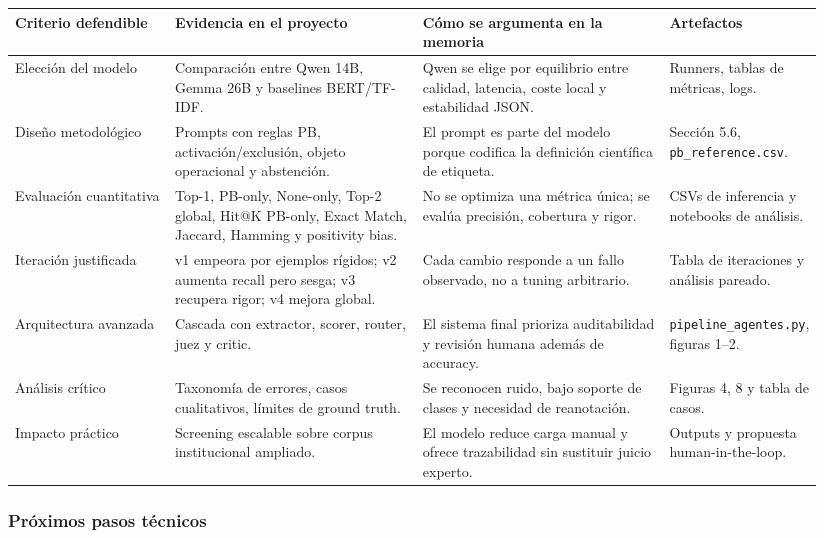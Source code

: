 \begin{center}
\scriptsize
\setlength{\tabcolsep}{4pt}
\renewcommand{\arraystretch}{1.18}
\begin{tabular}{p{0.20\linewidth}p{0.31\linewidth}p{0.31\linewidth}p{0.12\linewidth}}
\toprule
Criterio defendible & Evidencia en el proyecto & Cómo se argumenta en la memoria & Artefactos \\
\midrule
Elección del modelo & Comparación entre Qwen 14B, Gemma 26B y baselines BERT/TF-IDF. & Qwen se elige por equilibrio entre calidad, latencia, coste local y estabilidad JSON. & Runners, tablas de métricas, logs. \\
Diseño metodológico & Prompts con reglas PB, activación/exclusión, objeto operacional y abstención. & El prompt es parte del modelo porque codifica la definición científica de etiqueta. & Sección 5.6, \texttt{pb\_reference.csv}. \\
Evaluación cuantitativa & Top-1, PB-only, None-only, Top-2 global, Hit@K PB-only, Exact Match, Jaccard, Hamming y positivity bias. & No se optimiza una métrica única; se evalúa precisión, cobertura y rigor. & CSVs de inferencia y notebooks de análisis. \\
Iteración justificada & v1 empeora por ejemplos rígidos; v2 aumenta recall pero sesga; v3 recupera rigor; v4 mejora global. & Cada cambio responde a un fallo observado, no a tuning arbitrario. & Tabla de iteraciones y análisis pareado. \\
Arquitectura avanzada & Cascada con extractor, scorer, router, juez y critic. & El sistema final prioriza auditabilidad y revisión humana además de accuracy. & \texttt{pipeline\_agentes.py}, figuras 1--2. \\
Análisis crítico & Taxonomía de errores, casos cualitativos, límites de ground truth. & Se reconocen ruido, bajo soporte de clases y necesidad de reanotación. & Figuras 4, 8 y tabla de casos. \\
Impacto práctico & Screening escalable sobre corpus institucional ampliado. & El modelo reduce carga manual y ofrece trazabilidad sin sustituir juicio experto. & Outputs y propuesta human-in-the-loop. \\
\bottomrule
\end{tabular}
\end{center}

\subsubsection*{Próximos pasos técnicos}

